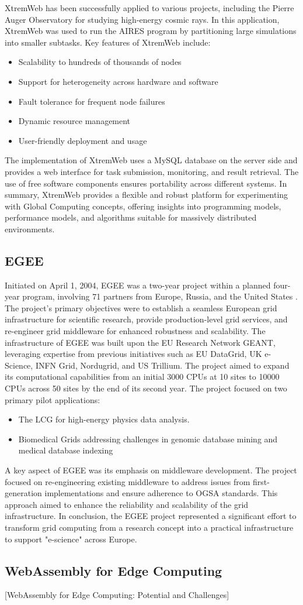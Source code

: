 XtremWeb has been successfully applied to various projects, including the Pierre Auger Observatory for studying high-energy cosmic rays. In this application, XtremWeb was used to run the \ac{AIRES} program by partitioning large simulations into smaller subtasks.
Key features of XtremWeb include:
\begin{itemize}
  \item Scalability to hundreds of thousands of nodes
  \item Support for heterogeneity across hardware and software
  \item Fault tolerance for frequent node failures
  \item Dynamic resource management
  \item User-friendly deployment and usage
\end{itemize}
The implementation of XtremWeb uses a MySQL database on the server side and provides a web interface for task submission, monitoring, and result retrieval. The use of free software components ensures portability across different systems.
In summary, XtremWeb provides a flexible and robust platform for experimenting with Global Computing concepts, offering insights into programming models, performance models, and algorithms suitable for massively distributed environments. \cite{relatedwork:xtremweb}
\subsection{EGEE}
\label{subsec:background:related_work:egee}
Initiated on April 1, 2004, \ac{EGEE} was a two-year project within a planned four-year program, involving 71 partners from Europe, Russia, and the United States \cite{relatedwork:egee}. The project's primary objectives were to establish a seamless European grid infrastructure for scientific research, provide production-level grid services, and re-engineer grid middleware for enhanced robustness and scalability.
The infrastructure of \ac{EGEE} was built upon the EU Research Network GEANT, leveraging expertise from previous initiatives such as EU DataGrid, UK e-Science, INFN Grid, Nordugrid, and US Trillium. The project aimed to expand its computational capabilities from an initial 3000 CPUs at 10 sites to 10000 CPUs across 50 sites by the end of its second year.
The project focused on two primary pilot applications: 
\begin{itemize}
  \item The \ac{LCG} for high-energy physics data analysis.
  \item Biomedical Grids addressing challenges in genomic database mining and medical database indexing
\end{itemize}
A key aspect of EGEE was its emphasis on middleware development. The project focused on re-engineering existing middleware to address issues from first-generation implementations and ensure adherence to \ac{OGSA} standards. This approach aimed to enhance the reliability and scalability of the grid infrastructure.
In conclusion, the \ac{EGEE} project represented a significant effort to transform grid computing from a research concept into a practical infrastructure to support "e-science" across Europe. \cite{relatedwork:egee}

\subsection{WebAssembly for Edge Computing}
\label{subsec:background:related_work:wasmedgecomputing}
[WebAssembly for Edge Computing: Potential and Challenges] \cite{relatedwork:wasmedgecomputing}